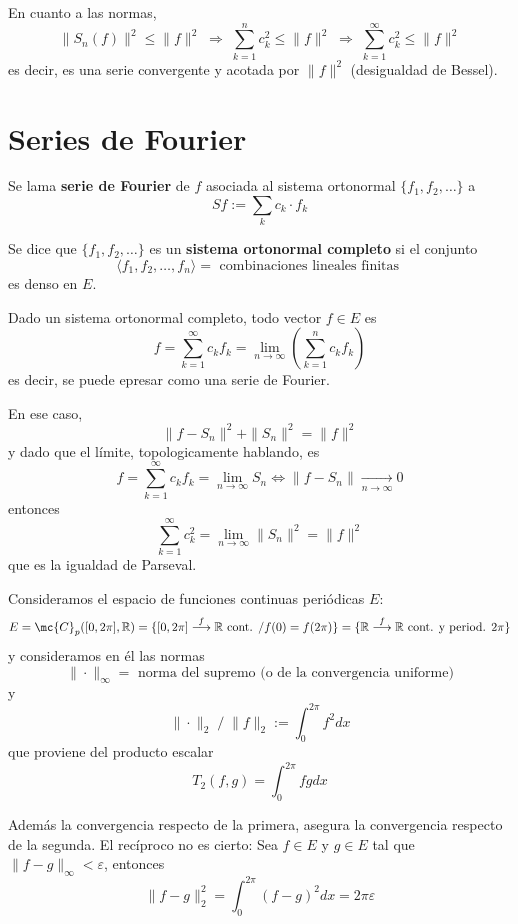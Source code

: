     En cuanto a las normas,
    $$\|S_n(f)\|^2 \leq \|f\|^2 \; \Rightarrow \; \sum_{k=1}^{n} c_k^2 \leq \|f\|^2  \; \Rightarrow \; \sum_{k=1}^{\infty} c_k^2 \leq \|f\|^2 $$
    es decir, es una serie convergente y acotada por $\|f\|^2$ (desigualdad de Bessel). 
    \section{Series de Fourier}
    \begin{defi}
        Se lama \textbf{serie de Fourier} de $f$ asociada al sistema ortonormal $\{f_1, f_2, \ldots\}$ a 
        $$Sf:=\sum_k c_k \cdot f_k$$
    \end{defi}
    \begin{defi}
        Se dice que $\{f_1, f_2, \ldots\}$ es un \textbf{sistema ortonormal completo} si el conjunto
        $$\langle f_1, f_2, \ldots, f_n  \rangle = \text{ combinaciones lineales finitas }$$
        es denso en $E$.
    \end{defi}
    \begin{prop}
        Dado un sistema ortonormal completo, todo vector $f \in E$ es 
        $$f=\sum_{k=1}^{\infty} c_k f_k = \lim_{n \to \infty} \left( \sum_{k=1}^{n} c_k f_k  \right)$$
        es decir, se puede epresar como una serie de Fourier.
    \end{prop}
    \begin{cor} En ese caso, 
    $$\|f-S_n\|^2+\|S_n\|^2=\|f\|^2$$
    y dado que el límite, topologicamente hablando, es
    $$f=\sum_{k=1}^{\infty} c_k f_k = \lim_{n \to \infty} S_n \iff \|f-S_n\| \underset{n \to \infty}{\longrightarrow} 0$$
       entonces $$\sum_{k=1}^{\infty} c_k^2 = \lim_{n \to \infty} \|S_n\|^2=\|f\|^2 $$
        que es la igualdad de Parseval.
    \end{cor}
    \begin{defi}
        Consideramos el espacio de funciones continuas periódicas $E$:
        $$E=\mc{C}_p([0,2\pi],\mathbb R)=\{[0,2\pi] \overset{f}{\longrightarrow} \mathbb R \text{ cont. } / f(0)=f(2\pi)\}=\{\mathbb R \overset{f}{\longrightarrow} \mathbb R \text{ cont. y period. } 2 \pi \}$$
        y consideramos en él las normas 
        $$\|\cdot\|_{\infty}=\text{ norma del supremo (o de la convergencia uniforme)}$$
        y 
        $$\|\cdot\|_{2} \; / \;  \|f\|_2:= \int_0^{2\pi} f^2 dx$$
        que proviene del producto escalar
        $$T_2(f,g)=\int_0^{2\pi} fg dx$$

    \end{defi}
        \begin{obs}Además la convergencia respecto de la primera, asegura la convergencia respecto de la segunda. El recíproco no es cierto:
        Sea $f \in E$ y $g \in E$ tal que $\|f-g\|_{\infty} < \varepsilon$, entonces
        $$\|f-g\|_2^2=\int_0^{2\pi}(f-g)^2dx=2\pi\varepsilon$$ 
        \label{obsconv}
        \end{obs}
